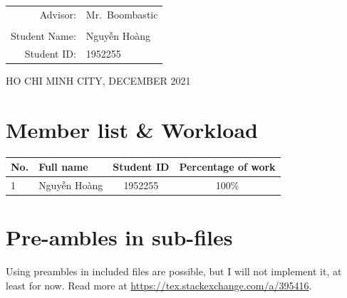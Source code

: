 \documentclass{article}
\numberwithin{equation}{section} %
\begin{document}
\begin{titlepage}
    \vspace{3cm}

    \begin{table}[h]
        \begin{tabular}{rl}
            \hspace{1cm} Advisor:      & Mr.\ Boombastic \\ %
                                       &                 \\
            \hspace{1cm} Student Name: & Nguyễn Hoàng    \\ %
            \hspace{1cm} Student ID\@: & 1952255         \\ %
        \end{tabular}
    \end{table}

    \begin{center}
        {\footnotesize HO CHI MINH CITY, DECEMBER 2021} \\ %
    \end{center}
\end{titlepage}


\section*{Member list \& Workload}
\begin{center}
    \begin{tabular}{llcc} %
        \toprule
        \textbf{No.} & \textbf{Full name} & \textbf{Student ID} & \textbf{Percentage of work} \\
        \midrule
        1            & Nguyễn Hoàng       & 1952255             & 100\%                       \\
        \bottomrule
    \end{tabular}
\end{center}

\newpage
\tableofcontents
\newpage

\section{Pre-ambles in sub-files}
Using preambles in included files are possible, but I will not implement it, at least for now.
Read more at \url{https://tex.stackexchange.com/a/395416}.
\end{document}

